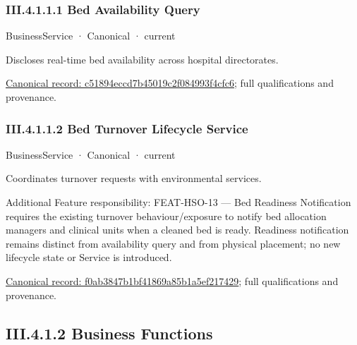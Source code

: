\subsubsection*{III.4.1.1.1 Bed Availability Query}
\label{navigation:III.4.1.1.1}

\label{element:c51894eccd7b45019c2f084993f4cfc6}
{\small BusinessService · Canonical · current}\par

Discloses real-time bed availability across hospital directorates.


{\footnotesize \href{../../../../continuum/business/business-service/c51894eccd7b45019c2f084993f4cfc6.md}{Canonical record: c51894eccd7b45019c2f084993f4cfc6}; full qualifications and provenance.}\par
\subsubsection*{III.4.1.1.2 Bed Turnover Lifecycle Service}
\label{navigation:III.4.1.1.2}

\label{element:f0ab3847b1bf41869a85b1a5ef217429}
{\small BusinessService · Canonical · current}\par

Coordinates turnover requests with environmental services.



Additional Feature responsibility: FEAT-HSO-13 — Bed Readiness Notification requires the existing turnover behaviour/exposure to notify bed allocation managers and clinical units when a cleaned bed is ready. Readiness notification remains distinct from availability query and from physical placement; no new lifecycle state or Service is introduced.


{\footnotesize \href{../../../../continuum/business/business-service/f0ab3847b1bf41869a85b1a5ef217429.md}{Canonical record: f0ab3847b1bf41869a85b1a5ef217429}; full qualifications and provenance.}\par
\subsection*{III.4.1.2 Business Functions}
\label{navigation:III.4.1.2}

